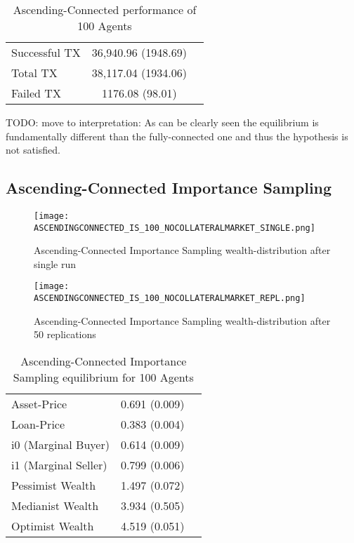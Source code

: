 \documentclass[Bachelorarbeit.tex]{subfiles}
\begin{document}
\begin{table}[h]
	\caption{Ascending-Connected performance of 100 Agents}
	\centering
	\begin{tabular} { l c r }
		\hline
		Successful TX & 36,940.96 (1948.69) \\
		Total TX & 38,117.04 (1934.06) \\
		Failed TX & 1176.08 (98.01) \\
		\hline
	\end{tabular}
\end{table}

TODO: move to interpretation: As can be clearly seen the equilibrium is fundamentally different than the fully-connected one and thus the hypothesis is not satisfied.

\subsection{Ascending-Connected Importance Sampling}
\begin{figure}[!htbp]
	\centering
  \texttt{[image: ASCENDINGCONNECTED\_IS\_100\_NOCOLLATERALMARKET\_SINGLE.png]}
	\caption{Ascending-Connected Importance Sampling wealth-distribution after single run}
	\label{fig1}
\end{figure}

\begin{figure}[!htbp]
	\centering
  \texttt{[image: ASCENDINGCONNECTED\_IS\_100\_NOCOLLATERALMARKET\_REPL.png]}
	\caption{Ascending-Connected Importance Sampling wealth-distribution after 50 replications}
	\label{fig1}
\end{figure}

\begin{table}[h]
	\caption{Ascending-Connected Importance Sampling equilibrium for 100 Agents}
	\centering
	\begin{tabular} { l c r }
		\hline
		Asset-Price & 0.691 (0.009) \\
		Loan-Price & 0.383 (0.004) \\
		i0 (Marginal Buyer) & 0.614 (0.009) \\
		i1 (Marginal Seller) & 0.799 (0.006) \\
		Pessimist Wealth & 1.497 (0.072) \\
		Medianist Wealth & 3.934 (0.505) \\
		Optimist Wealth & 4.519 (0.051) \\
		\hline
	\end{tabular}
\end{table} 
\end{document}
